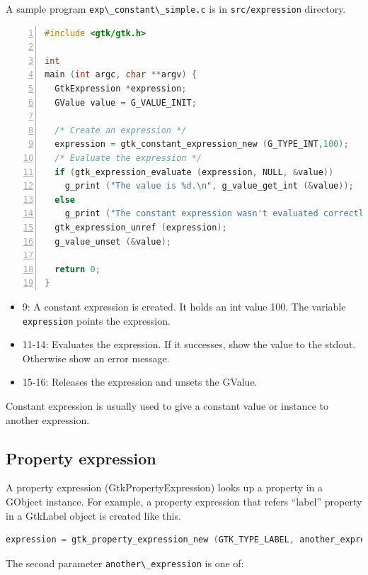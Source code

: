A sample program \passthrough{\lstinline!exp\_constant\_simple.c!} is in
\passthrough{\lstinline!src/expression!} directory.

\begin{lstlisting}[language=C, numbers=left]
#include <gtk/gtk.h>

int
main (int argc, char **argv) {
  GtkExpression *expression;
  GValue value = G_VALUE_INIT;

  /* Create an expression */
  expression = gtk_constant_expression_new (G_TYPE_INT,100);
  /* Evaluate the expression */
  if (gtk_expression_evaluate (expression, NULL, &value))
    g_print ("The value is %d.\n", g_value_get_int (&value));
  else
    g_print ("The constant expression wasn't evaluated correctly.\n");
  gtk_expression_unref (expression);
  g_value_unset (&value);

  return 0;
}
\end{lstlisting}

\begin{itemize}
\tightlist
\item
  9: A constant expression is created. It holds an int value 100. The
  variable \passthrough{\lstinline!expression!} points the expression.
\item
  11-14: Evaluates the expression. If it successes, show the value to
  the stdout. Otherwise show an error message.
\item
  15-16: Releases the expression and unsets the GValue.
\end{itemize}

Constant expression is usually used to give a constant value or instance
to another expression.

\subsection{Property expression}\label{property-expression}

A property expression (GtkPropertyExpression) looks up a property in a
GObject instance. For example, a property expression that refers
``label'' property in a GtkLabel object is created like this.

\begin{lstlisting}[language=C]
expression = gtk_property_expression_new (GTK_TYPE_LABEL, another_expression, "label");
\end{lstlisting}

The second parameter \passthrough{\lstinline!another\_expression!} is
one of:

